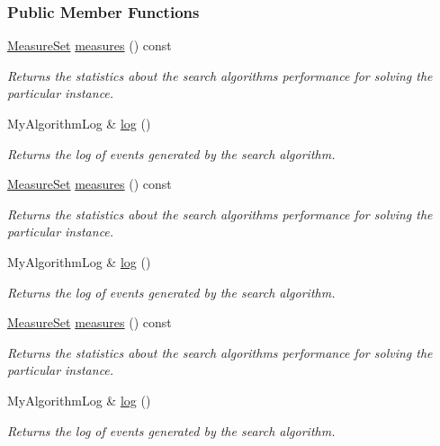 \subsubsection*{Public Member Functions}
\begin{DoxyCompactItemize}
\item 
\hyperlink{structMeasureSet}{Measure\+Set} \hyperlink{structalgorithm_1_1Algorithm_ac42a45c30ddd848b8727f09a883298a5}{measures} () const 
\begin{DoxyCompactList}\small\item\em Returns the statistics about the search algorithm\textquotesingle{}s performance for solving the particular instance. \end{DoxyCompactList}\item 
My\+Algorithm\+Log \& \hyperlink{structalgorithm_1_1Algorithm_ae990a70f1d0457de120111fbef8083ce}{log} ()
\begin{DoxyCompactList}\small\item\em Returns the log of events generated by the search algorithm. \end{DoxyCompactList}\item 
\hyperlink{structMeasureSet}{Measure\+Set} \hyperlink{structalgorithm_1_1Algorithm_ac42a45c30ddd848b8727f09a883298a5}{measures} () const 
\begin{DoxyCompactList}\small\item\em Returns the statistics about the search algorithm\textquotesingle{}s performance for solving the particular instance. \end{DoxyCompactList}\item 
My\+Algorithm\+Log \& \hyperlink{structalgorithm_1_1Algorithm_ae990a70f1d0457de120111fbef8083ce}{log} ()
\begin{DoxyCompactList}\small\item\em Returns the log of events generated by the search algorithm. \end{DoxyCompactList}\item 
\hyperlink{structMeasureSet}{Measure\+Set} \hyperlink{structalgorithm_1_1Algorithm_ac42a45c30ddd848b8727f09a883298a5}{measures} () const 
\begin{DoxyCompactList}\small\item\em Returns the statistics about the search algorithm\textquotesingle{}s performance for solving the particular instance. \end{DoxyCompactList}\item 
My\+Algorithm\+Log \& \hyperlink{structalgorithm_1_1Algorithm_ae990a70f1d0457de120111fbef8083ce}{log} ()
\begin{DoxyCompactList}\small\item\em Returns the log of events generated by the search algorithm. \end{DoxyCompactList}\end{DoxyCompactItemize}
